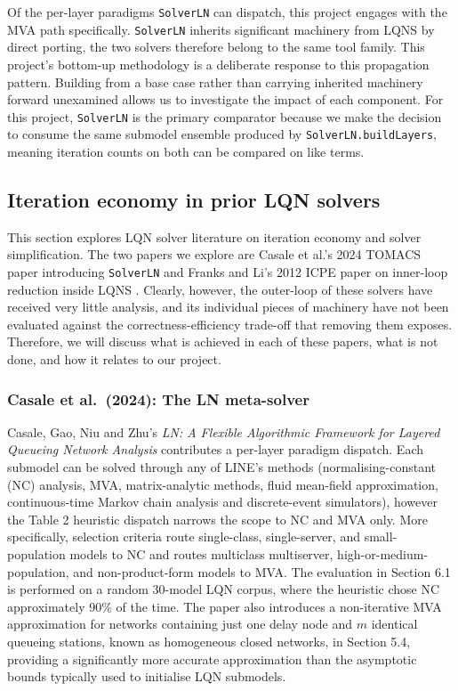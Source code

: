 Of the per-layer paradigms \texttt{SolverLN} can dispatch, this project engages with the MVA path specifically. \texttt{SolverLN} inherits significant machinery from LQNS by direct porting, the two solvers therefore belong to the same tool family. This project's bottom-up methodology is a deliberate response to this propagation pattern. Building from a base case rather than carrying inherited machinery forward unexamined allows us to investigate the impact of each component. For this project, \texttt{SolverLN} is the primary comparator because we make the decision to consume the same submodel ensemble produced by \texttt{SolverLN.buildLayers}, meaning iteration counts on both can be compared on like terms.

\subsection{Iteration economy in prior LQN solvers}
\label{sec:lqn-related-work}

This section explores LQN solver literature on iteration economy and solver simplification. The two papers we explore are Casale et al.'s 2024 TOMACS paper introducing \texttt{SolverLN} \cite{casale2024} and Franks and Li's 2012 ICPE paper on inner-loop reduction inside LQNS \cite{franksli2012}. Clearly, however, the outer-loop of these solvers have received very little analysis, and its individual pieces of machinery have not been evaluated against the correctness-efficiency trade-off that removing them exposes. Therefore, we will discuss what is achieved in each of these papers, what is not done, and how it relates to our project.

\subsubsection*{Casale et al.\ (2024): The LN meta-solver}

Casale, Gao, Niu and Zhu's \textit{LN: A Flexible Algorithmic Framework for Layered Queueing Network Analysis} \cite{casale2024} contributes a per-layer paradigm dispatch. Each submodel can be solved through any of LINE's methods (normalising-constant (NC) analysis, MVA, matrix-analytic methods, fluid mean-field approximation, continuous-time Markov chain analysis and discrete-event simulators), however the Table 2 heuristic dispatch narrows the scope to NC and MVA only. More specifically, selection criteria route single-class, single-server, and small-population models to NC and routes multiclass multiserver, high-or-medium-population, and non-product-form models to MVA. The evaluation in Section 6.1 is performed on a random 30-model LQN corpus, where the heuristic chose NC approximately 90\% of the time. The paper also introduces a non-iterative MVA approximation for networks containing just one delay node and $m$ identical queueing stations, known as homogeneous closed networks, in Section 5.4, providing a significantly more accurate approximation than the asymptotic bounds typically used to initialise LQN submodels.

